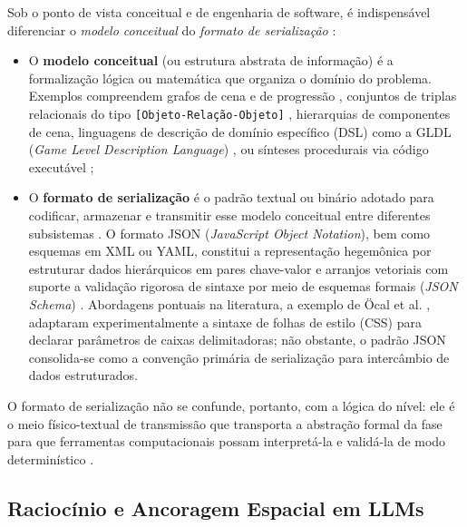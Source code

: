 Sob o ponto de vista conceitual e de engenharia de software, é indispensável diferenciar o \textit{modelo conceitual} do \textit{formato de serialização} \cite{xu2025constraint, xu2025databasedrivenframework3dlevel, chen2025narrative}:
\begin{itemize}
    \item O \textbf{modelo conceitual} (ou estrutura abstrata de informação) é a formalização lógica ou matemática que organiza o domínio do problema. Exemplos compreendem grafos de cena e de progressão \cite{xu2025databasedrivenframework3dlevel, wang2026designerlyloop}, conjuntos de triplas relacionais do tipo \texttt{[Objeto-Relação-Objeto]} \cite{chen2025narrative}, hierarquias de componentes de cena, linguagens de descrição de domínio específico (DSL) como a GLDL (\textit{Game Level Description Language}) \cite{xu2025constraint}, ou sínteses procedurais via código executável \cite{hu2024scenecraft, yang2026codeasroomgenerating3drooms};
    \item O \textbf{formato de serialização} é o padrão textual ou binário adotado para codificar, armazenar e transmitir esse modelo conceitual entre diferentes subsistemas \cite{sun2024roomplanner, xu2025databasedrivenframework3dlevel}. O formato JSON (\textit{JavaScript Object Notation}), bem como esquemas em XML ou YAML, constitui a representação hegemônica por estruturar dados hierárquicos em pares chave-valor e arranjos vetoriais com suporte a validação rigorosa de sintaxe por meio de esquemas formais (\textit{JSON Schema}) \cite{tang2025unrealllm, sun2024roomplanner, xu2025databasedrivenframework3dlevel}. Abordagens pontuais na literatura, a exemplo de Öcal et al. \cite{ocal2024sceneteller}, adaptaram experimentalmente a sintaxe de folhas de estilo (CSS) para declarar parâmetros de caixas delimitadoras; não obstante, o padrão JSON consolida-se como a convenção primária de serialização para intercâmbio de dados estruturados.
\end{itemize}

O formato de serialização não se confunde, portanto, com a lógica do nível: ele é o meio físico-textual de transmissão que transporta a abstração formal da fase para que ferramentas computacionais possam interpretá-la e validá-la de modo determinístico \cite{tang2025unrealllm, xu2025databasedrivenframework3dlevel}.

\subsection{Raciocínio e Ancoragem Espacial em LLMs}
\label{sec:spatial_grounding}

